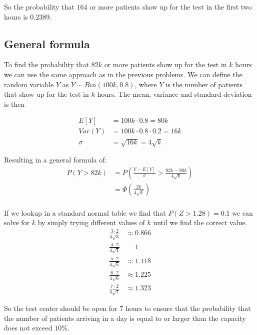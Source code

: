 So the probability that $164$ or more patients show up for the test in the first two hours is $0.2389$.

\subsection{General formula}
To find the probability that $82k$ or more patients show up for the test in $k$ hours we can use the same approach as in the previous problems. We can define the random variable $Y$ as $Y \sim Bin(100k, 0.8)$, where $Y$ is the number of patients that show up for the test in $k$ hours. The mean, variance and standard deviation is then

\begin{align*}
	E[Y]   & = 100k \cdot 0.8 = 80k           \\
	Var(Y) & = 100k \cdot 0.8 \cdot 0.2 = 16k \\
	\sigma & = \sqrt{16k} = 4\sqrt{k}
\end{align*}

Resulting in a general formula of:
\begin{align*}
	P(Y > 82k) & = P\left(\frac{Y - E[Y]}{\sigma} > \frac{82k - 80k}{4\sqrt{k}}\right) \\
	           & = \Phi\left(\frac{2k}{4\sqrt{k}}\right)                               \\
\end{align*}

If we lookup in a standard normal table we find that $P(Z > 1.28) = 0.1$ we can solve for $k$ by simply trying different values of $k$ until we find the correct value.
\begin{align*}
	\frac{3 \cdot 2}{4\sqrt{3}} & \approx 0.866 \\
	\frac{4 \cdot 2}{4\sqrt{4}} & = 1           \\
	\frac{5 \cdot 2}{4\sqrt{5}} & \approx 1.118 \\
	\frac{6 \cdot 2}{4\sqrt{6}} & \approx 1.225 \\
	\frac{7 \cdot 2}{4\sqrt{7}} & \approx 1.323
\end{align*}

So the test center should be open for $7$ hours to ensure that the probability that the number of patients arriving in a day is equal to or larger than the capacity does not exceed $10\%$.
